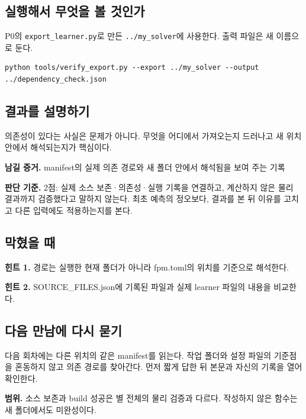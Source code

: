 \documentclass[
  10pt,
  a4paper,
]{article}
\begin{document}
\newpage

\subsection{실행해서 무엇을 볼
것인가}\label{uxc2e4uxd589uxd574uxc11c-uxbb34uxc5c7uxc744-uxbcfc-uxac83uxc778uxac00}

P0의 \texttt{export\_learner.py}로 만든 \texttt{../my\_solver}에
사용한다. 출력 파일은 새 이름으로 둔다.

\begin{verbatim}
python tools/verify_export.py --export ../my_solver --output ../dependency_check.json
\end{verbatim}

\subsection{결과를
설명하기}\label{uxacb0uxacfcuxb97c-uxc124uxba85uxd558uxae30}

의존성이 있다는 사실은 문제가 아니다. 무엇을 어디에서 가져오는지
드러나고 새 위치 안에서 해석되는지가 핵심이다.

\textbf{남길 증거.} manifest의 실제 의존 경로와 새 폴더 안에서 해석됨을
보여 주는 기록

\textbf{판단 기준.} 2점: 실제 소스 보존·의존성·실행 기록을 연결하고,
계산하지 않은 물리 결과까지 검증했다고 말하지 않는다. 최초 예측의
정오보다, 결과를 본 뒤 이유를 고치고 다른 입력에도 적용하는지를 본다.

\subsection{막혔을 때}\label{uxb9c9uxd614uxc744-uxb54c}

\textbf{힌트 1.} 경로는 실행한 현재 폴더가 아니라 fpm.toml의 위치를
기준으로 해석한다.

\textbf{힌트 2.} SOURCE\_FILES.json에 기록된 파일과 실제 learner 파일의
내용을 비교한다.

\subsection{다음 만남에 다시
묻기}\label{uxb2e4uxc74c-uxb9ccuxb0a8uxc5d0-uxb2e4uxc2dc-uxbb3buxae30}

다음 회차에는 다른 위치의 같은 manifest를 읽는다. 작업 폴더와 설정
파일의 기준점을 혼동하지 않고 의존 경로를 찾아간다. 먼저 짧게 답한 뒤
본문과 자신의 기록을 열어 확인한다.

\textbf{범위.} 소스 보존과 build 성공은 별 전체의 물리 검증과 다르다.
작성하지 않은 함수는 새 폴더에서도 미완성이다.
\end{document}
